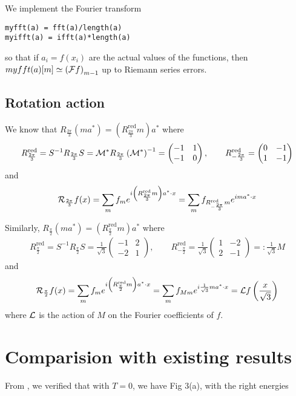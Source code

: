 \documentclass[11pt,a4paper,reqno,french,tikz]{amsart}
\newcommand{\pa}[1]{\left( #1 \right)} %
\newcommand{\f}[2]{\frac{#1}{#2}} %
\newcommand{\mat}[1]{\begin{pmatrix} #1 \end{pmatrix}} %
\begin{document}
We implement the Fourier transform
\begin{lstlisting}
myfft(a) = fft(a)/length(a)
myifft(a) = ifft(a)*length(a)
\end{lstlisting}
so that if $a_i = f(x_i)$ are the actual values of the functions, then $myfft(a)[m] \simeq \pa{\cF f}_{m-1}$ up to Riemann series errors.


\subsection{Rotation action}%
\label{sub:rotation_action}


We know that $R_{\f{2\pi}3} \pa{ma^* } = \pa{R_{\f{2\pi}3}^{\text{red}} m} a^*$ where
\begin{align*}
	R_{\f{2\pi}3}^{\text{red}} = S^{-1} R_{\f{2\pi}3} S =  \cM^* R_{\f{2\pi}3} \pa{\cM^*}^{-1} = \mat{-1 & 1 \\ -1 & 0}, \qquad R_{-\f{2\pi}3}^{\text{red}} = \mat{0 & -1 \\ 1 & -1}
\end{align*}
and
\begin{align*}
\cR_{\f{2\pi}3} f(x) = \sum_m f_m e^{i \pa{R_{\f{2\pi}3}^{\text{red}} m} a^* \cdot x} = \sum_m f_{R_{-\f{2\pi}3}^{\text{red}} m} e^{im a^* \cdot x}
\end{align*}

Similarly, $R_{\f{\pi}2}  \pa{ma^* } = \pa{R_{\f{\pi}2}^{\text{red}} m} a^*$ where
\begin{align*}
	R_{\f{\pi}2} ^{\text{red}} = S^{-1} R_{\f{\pi}2}  S = \f{1}{\sqrt 3} \mat{-1 & 2 \\ -2 & 1}, \qquad R_{-\f{\pi}2}^{\text{red}} = \f{1}{\sqrt 3} \mat{1 & -2 \\ 2 & -1} =: \f{1}{\sqrt 3} M
\end{align*}
and
\begin{align*}
\cR_{\f{\pi}2} f(x) = \sum_m f_m e^{i \pa{R_{\f{\pi}2}^{\text{red}} m} a^* \cdot x} = \sum_m f_{M m} e^{i \f{1}{\sqrt 3} m a^* \cdot x} = \cL f\pa{\f{x}{\sqrt 3}}
\end{align*}
where $\mathcal{L}$ is the action of $M$ on the Fourier coefficients of $f$.

\section{Comparision with existing results}%
\label{sec:comparision_with_existing_results}

From \cite{FanCarZhu19}, we verified that with $T=0$, we have Fig 3(a), with the right energies
\end{document}
